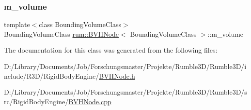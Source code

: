 \mbox{\label{classrum_1_1_b_v_h_node_aae21162bff289e2d0d502c9360d0f36c}} 
\subsubsection{\texorpdfstring{m\+\_\+volume}{m\_volume}}
{\footnotesize\ttfamily template$<$class Bounding\+Volume\+Class$>$ \\
Bounding\+Volume\+Class \mbox{\hyperlink{classrum_1_1_b_v_h_node}{rum\+::\+B\+V\+H\+Node}}$<$ Bounding\+Volume\+Class $>$\+::m\+\_\+volume\hspace{0.3cm}{\ttfamily [protected]}}



The documentation for this class was generated from the following files\+:\begin{DoxyCompactItemize}
\item 
D\+:/\+Library/\+Documents/\+Job/\+Forschungsmaster/\+Projekte/\+Rumble3\+D/\+Rumble3\+D/include/\+R3\+D/\+Rigid\+Body\+Engine/\mbox{\hyperlink{_b_v_h_node_8h}{B\+V\+H\+Node.\+h}}\item 
D\+:/\+Library/\+Documents/\+Job/\+Forschungsmaster/\+Projekte/\+Rumble3\+D/\+Rumble3\+D/src/\+Rigid\+Body\+Engine/\mbox{\hyperlink{_b_v_h_node_8cpp}{B\+V\+H\+Node.\+cpp}}\end{DoxyCompactItemize}

